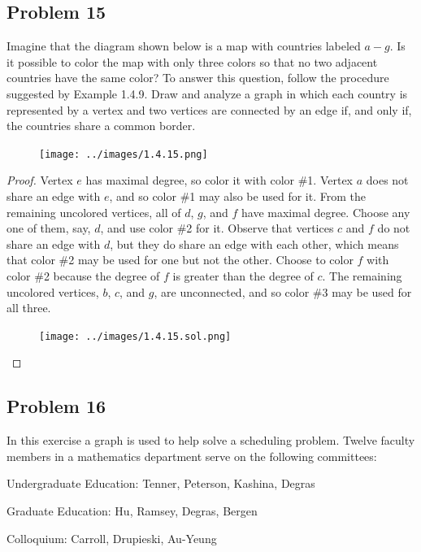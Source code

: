\documentclass[14pt]{extarticle}
\begin{document}
\subsection{Problem 15}
Imagine that the diagram shown below is a map with countries labeled $a-g$.
Is it possible to color the map with only three colors so that no two adjacent
countries have the same color? To answer this question, follow the procedure
suggested by Example 1.4.9. Draw and analyze a graph in which each country is
represented by a vertex and two vertices are connected by an edge if, and only
if, the countries share a common border.

\begin{figure}[ht!]
    \centering
    \texttt{[image: ../images/1.4.15.png]}
\end{figure}

\begin{proof}
    Vertex $e$ has maximal degree, so color it with color \#1. Vertex $a$ does not
    share an edge with $e$, and so color \#1 may also be used for it. From the
    remaining uncolored vertices, all of $d$, $g$, and $f$ have maximal degree.
    Choose any one of them, say, $d$, and use color \#2 for it. Observe that
    vertices $c$ and $f$ do not share an edge with $d$, but they do share an edge
    with each other, which means that color \#2 may be used for one but not the
    other. Choose to color $f$ with color \#2 because the degree of $f$ is greater
    than the degree of $c$. The remaining uncolored vertices, $b$, $c$, and $g$,
    are unconnected, and so color \#3 may be used for all three.

    \begin{figure}[ht!]
        \centering
        \texttt{[image: ../images/1.4.15.sol.png]}
    \end{figure}
\end{proof}

\subsection{Problem 16}
In this exercise a graph is used to help solve a scheduling problem. Twelve
faculty members in a mathematics department serve on the following
committees:

Undergraduate Education: Tenner, Peterson, Kashina, Degras

Graduate Education: Hu, Ramsey, Degras, Bergen

Colloquium: Carroll, Drupieski, Au-Yeung
\end{document}
